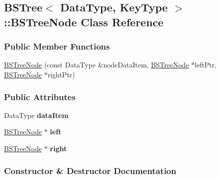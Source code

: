 \hypertarget{class_b_s_tree_1_1_b_s_tree_node}{}\subsection{B\+S\+Tree$<$ Data\+Type, Key\+Type $>$\+:\+:B\+S\+Tree\+Node Class Reference}
\label{class_b_s_tree_1_1_b_s_tree_node}
\subsubsection*{Public Member Functions}
\begin{DoxyCompactItemize}
\item 
\hyperlink{class_b_s_tree_1_1_b_s_tree_node_a40f0e1ccea243f6d47b5c1b0a2913ff8}{B\+S\+Tree\+Node} (const Data\+Type \&node\+Data\+Item, \hyperlink{class_b_s_tree_1_1_b_s_tree_node}{B\+S\+Tree\+Node} $\ast$left\+Ptr, \hyperlink{class_b_s_tree_1_1_b_s_tree_node}{B\+S\+Tree\+Node} $\ast$right\+Ptr)
\end{DoxyCompactItemize}
\subsubsection*{Public Attributes}
\begin{DoxyCompactItemize}
\item 
Data\+Type {\bfseries data\+Item}\hypertarget{class_b_s_tree_1_1_b_s_tree_node_a507c8d6dde1b8d35d9af6b4e78f38962}{}\label{class_b_s_tree_1_1_b_s_tree_node_a507c8d6dde1b8d35d9af6b4e78f38962}

\item 
\hyperlink{class_b_s_tree_1_1_b_s_tree_node}{B\+S\+Tree\+Node} $\ast$ {\bfseries left}\hypertarget{class_b_s_tree_1_1_b_s_tree_node_a7a90150dd249432e240dc363955c5ca1}{}\label{class_b_s_tree_1_1_b_s_tree_node_a7a90150dd249432e240dc363955c5ca1}

\item 
\hyperlink{class_b_s_tree_1_1_b_s_tree_node}{B\+S\+Tree\+Node} $\ast$ {\bfseries right}\hypertarget{class_b_s_tree_1_1_b_s_tree_node_a8d7bfd0208a562c8b8ab332e1d796563}{}\label{class_b_s_tree_1_1_b_s_tree_node_a8d7bfd0208a562c8b8ab332e1d796563}

\end{DoxyCompactItemize}


\subsubsection{Constructor \& Destructor Documentation}
